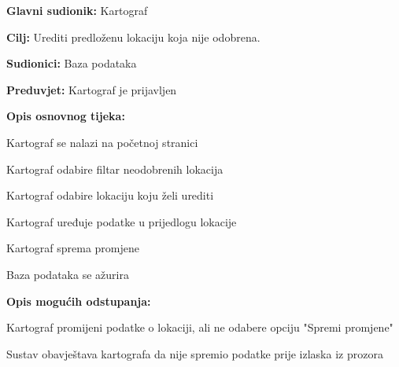 					\noindent {}
					\begin{packed_item}
	
						\item \textbf{Glavni sudionik: }Kartograf
						\item  \textbf{Cilj:} Urediti predloženu lokaciju koja nije odobrena.
						\item  \textbf{Sudionici:} Baza podataka
						\item  \textbf{Preduvjet:} Kartograf je prijavljen
						\item  \textbf{Opis osnovnog tijeka:}
						
						\item[] \begin{packed_enum}
	
							\item Kartograf se nalazi na početnoj stranici
							\item Kartograf odabire filtar neodobrenih lokacija
							\item Kartograf odabire lokaciju koju želi urediti
							\item Kartograf uređuje podatke u prijedlogu lokacije
							\item Kartograf sprema promjene
							\item Baza podataka se ažurira

						\end{packed_enum}
						
						\item  \textbf{Opis mogućih odstupanja:}
						
						\item[] \begin{packed_item}
	
							\item[2.a] Kartograf promijeni podatke o lokaciji, ali ne odabere opciju "Spremi promjene"
							\item[] \begin{packed_enum}
								
								\item Sustav obavještava kartografa da nije spremio podatke prije izlaska iz prozora
								
							\end{packed_enum}
							
						\end{packed_item}
					\end{packed_item}
					
